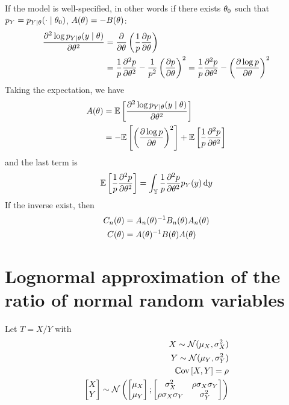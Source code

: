 \documentclass[../../Main_ManuscritThese.tex]{subfiles}
\begin{document}
  If the model is well-specified, in other words if there exists $\theta_0$ such that $p_Y = p_{Y\mid \theta}(\cdot \mid\theta_0)$, $A(\theta) = -B(\theta)$:
  \begin{align}
    \frac{\partial^2 \log p_{Y\mid \theta}(y \mid \theta)}{\partial \theta^2} &= \frac{\partial }{\partial \theta}\left(\frac{1}{p}\frac{\partial p}{\partial \theta}\right) \\
    &= \frac{1}{p}\frac{\partial^2 p}{\partial \theta^2} - \frac{1}{p^2}\left(\frac{\partial p}{\partial \theta}\right)^2 = \frac{1}{p}\frac{\partial^2 p}{\partial \theta^2} - \left(\frac{\partial \log p}{\partial \theta}\right)^2
  \end{align}
  Taking the expectation, we have
  \begin{align}
    A(\theta) &= \mathbb{E}\left[\frac{\partial^2 \log p_{Y\mid \theta}(y \mid \theta)}{\partial \theta^2}\right] \\
           &= -\mathbb{E}\left[\left(\frac{\partial \log p}{\partial \theta}\right)^2\right] + \mathbb{E}\left[\frac{1}{p}\frac{\partial^2 p}{\partial \theta^2}\right]
  \end{align}
  and the last term is
  \begin{align}
     \mathbb{E}\left[\frac{1}{p}\frac{\partial^2 p}{\partial \theta^2}\right] = \int_{\mathbb{Y}} \frac{1}{p}\frac{\partial^2 p}{\partial \theta^2} p_{Y}(y) \,\mathrm{d}y
  \end{align}
  If the inverse exist,
  then
  \begin{align}
    C_n(\theta) &= A_n(\theta)^{-1} B_n(\theta) A_n(\theta) \\
    C(\theta) &= A(\theta)^{-1}B(\theta)A(\theta)
  \end{align}

  \section{Lognormal approximation of the ratio of normal random variables}
  \label{sec:lognorm_ratio}
Let $T = X/Y$ with
  \begin{align}
    X \sim \mathcal{N}(\mu_X, \sigma^2_X) \\
    Y \sim \mathcal{N}(\mu_Y, \sigma^2_Y) \\
    \Cov\left[X, Y\right] = \rho \\
    \begin{bmatrix}
      X \\ Y
    \end{bmatrix} \sim \mathcal{N}\left(%
    \begin{bmatrix}
      \mu_X \\ \mu_Y
    \end{bmatrix};%
    \begin{bmatrix}
      \sigma^2_X  & \rho \sigma_X \sigma_Y \\
      \rho\sigma_X \sigma_Y & \sigma^2_Y
    \end{bmatrix} \right)
  \end{align}
  
\end{document}
